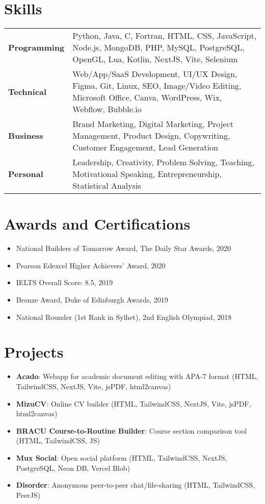 \documentclass[10pt,a4paper]{article}
\begin{document}
\section*{Skills}
\begin{tabularx}{\textwidth}{@{}lX@{}}
    \textbf{Programming} & Python, Java, C, Fortran, HTML, CSS, JavaScript, Node.js, MongoDB, PHP, MySQL, PostgreSQL, OpenGL, Lua, Kotlin, NextJS, Vite, Selenium \\
    \textbf{Technical} & Web/App/SaaS Development, UI/UX Design, Figma, Git, Linux, SEO, Image/Video Editing, Microsoft Office, Canva, WordPress, Wix, Webflow, Bubble.io \\
    \textbf{Business} & Brand Marketing, Digital Marketing, Project Management, Product Design, Copywriting, Customer Engagement, Lead Generation \\
    \textbf{Personal} & Leadership, Creativity, Problem Solving, Teaching, Motivational Speaking, Entrepreneurship, Statistical Analysis \\
\end{tabularx}

\section*{Awards and Certifications}
\begin{itemize}
    \item National Builders of Tomorrow Award, The Daily Star Awards, 2020
    \item Pearson Edexcel Higher Achievers' Award, 2020
    \item IELTS Overall Score: 8.5, 2019
    \item Bronze Award, Duke of Edinburgh Awards, 2019
    \item National Rounder (1st Rank in Sylhet), 2nd English Olympiad, 2018
\end{itemize}

\section*{Projects}
\begin{itemize}
    \item \textbf{Acado}: Webapp for academic document editing with APA-7 format (HTML, TailwindCSS, NextJS, Vite, jsPDF, html2canvas)
    \item \textbf{MizuCV}: Online CV builder (HTML, TailwindCSS, NextJS, Vite, jsPDF, html2canvas)
    \item \textbf{BRACU Course-to-Routine Builder}: Course section comparison tool (HTML, TailwindCSS, JS)
    \item \textbf{Mux Social}: Open social platform (HTML, TailwindCSS, NextJS, PostgreSQL, Neon DB, Vercel Blob)
    \item \textbf{Disorder}: Anonymous peer-to-peer chat/file-sharing (HTML, TailwindCSS, PeerJS)
\end{itemize}
\end{document}
